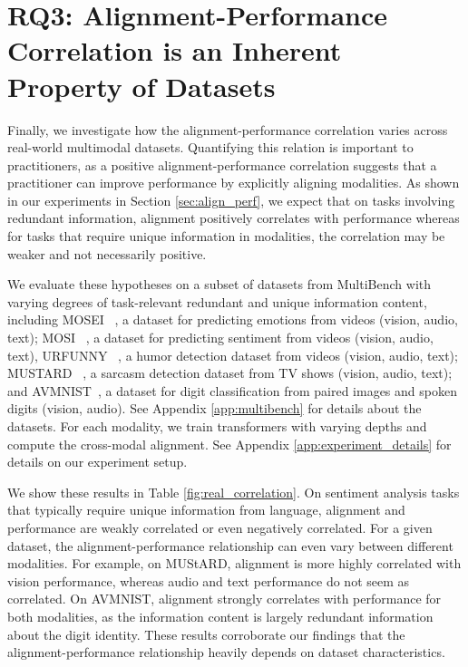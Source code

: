 \section{RQ3: Alignment-Performance Correlation is an Inherent Property of Datasets}

Finally, we investigate how the alignment-performance correlation varies across real-world multimodal datasets. Quantifying this relation is important to practitioners, as a positive alignment-performance correlation suggests that a practitioner can improve performance by explicitly aligning modalities. As shown in our experiments in Section \ref{sec:align_perf}, we expect that on tasks involving redundant information, alignment positively correlates with performance whereas for tasks that require unique information in modalities, the correlation may be weaker and not necessarily positive. 

We evaluate these hypotheses on a subset of datasets from MultiBench \cite{liang2021multibench} with varying degrees of task-relevant redundant and unique information content, including MOSEI ~\citep{bagher_zadeh_multimodal_2018}, a dataset for predicting emotions from videos (vision, audio, text); MOSI ~\citep{zadeh_mosi_2016}, a dataset for predicting sentiment from videos (vision, audio, text), URFUNNY ~\citep{hasan_ur-funny_2019}, a humor detection dataset from videos (vision, audio, text); MUSTARD ~\citep{castro_towards_2019}, a sarcasm detection dataset from TV shows (vision, audio, text); and AVMNIST~\citep{perez-rua_mfas_2019}, a dataset for digit classification from paired images and spoken digits (vision, audio). See Appendix \ref{app:multibench} for details about the datasets. For each modality, we train transformers with varying depths and compute the cross-modal alignment. See Appendix \ref{app:experiment_details} for details on our experiment setup. 

We show these results in Table \ref{fig:real_correlation}. On sentiment analysis tasks that typically require unique information from language, alignment and performance are weakly correlated or even negatively correlated. For a given dataset, the alignment-performance relationship can even vary between different modalities. For example, on MUStARD, alignment is more highly correlated with vision performance, whereas audio and text performance do not seem as correlated. On AVMNIST, alignment strongly correlates with performance for both modalities, as the information content is largely redundant information about the digit identity. These results corroborate our findings that the alignment-performance relationship heavily depends on dataset characteristics.
